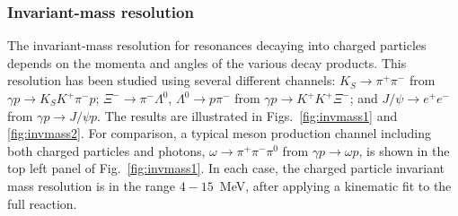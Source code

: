 \subsubsection{Invariant-mass resolution \label{sec:perfchargedresol}}

The invariant-mass resolution for resonances decaying into charged particles depends on the momenta and angles of the various decay products.  This resolution has been studied using several different channels:  $K_S\to\pi^+\pi^-$ from $\gamma p \to K_S K^+ \pi^- p$;  $\Xi^- \to \pi^- \Lambda^0$, $\Lambda^0 \to p \pi^-$ from $\gamma p \to K^+ K^+ \Xi^-$; and $J/\psi \to e^+ e^-$ from $\gamma p \to J/\psi p$.  The results are illustrated in Figs.~\ref{fig:invmass1} and \ref{fig:invmass2}.  For comparison, a typical meson production channel including both charged particles and photons, $\omega \to \pi^+\pi^-\pi^0$ from $\gamma p \to \omega p$, is shown in the top left panel of Fig.~\ref{fig:invmass1}.   In each case, the charged particle invariant mass resolution is in the range $4-15$~MeV, after applying a kinematic fit to the full reaction.


